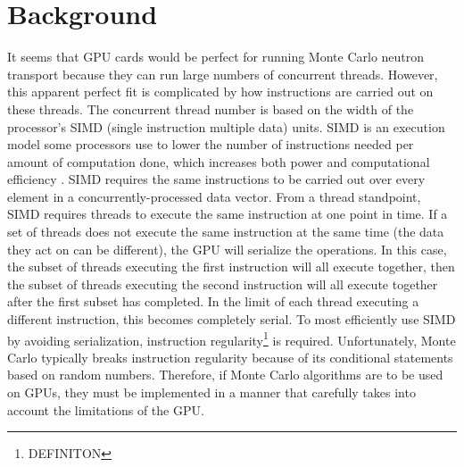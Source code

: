 \documentclass[preprint,12pt]{elsarticle}
\begin{document}
\section{Background}
\label{sec:background}
It seems that GPU cards would be perfect for running Monte Carlo neutron transport because they can run large numbers of concurrent threads.  
However, this apparent perfect fit is complicated by how instructions are carried out on these threads.  
The concurrent thread number is based on the width of the processor's SIMD (single instruction multiple data) units.  SIMD is an execution model some processors use to lower the number of instructions needed per amount of computation done, which increases both power and computational efficiency \cite{simd_power}.  SIMD requires the same instructions to be carried out over every element in a concurrently-processed data vector.  From a thread standpoint, SIMD requires threads to execute the same instruction at one point in time.  If a set of threads does not execute the same instruction at the same time (the data they act on can be different), the GPU will serialize the operations.  In this case, the subset of threads executing the first instruction will all execute together, then the subset of threads executing the second instruction will all execute together after the first subset has completed. In the limit of each thread executing a different instruction, this becomes completely serial.  To most efficiently use SIMD by avoiding serialization, instruction regularity\footnote{DEFINITON} is required. Unfortunately, Monte Carlo typically breaks instruction regularity because of its conditional statements based on random numbers.  Therefore, if Monte Carlo algorithms are to be used on GPUs, they must be implemented in a manner that carefully takes into account the limitations of the GPU.
\end{document}
